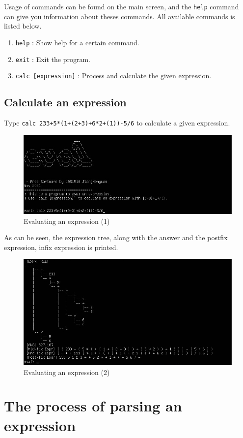 \documentclass[cn,black,12pt,normal]{elegantnote}
\begin{document}
Usage of commands can be found on the main screen, and the \lstinline{help} command can give you information about theses commands.  All available commands is listed below.

\begin{enumerate}
    \item \lstinline{help} : Show help for a certain command.
    \item \lstinline{exit} : Exit the program.
    \item \lstinline{calc [expression]} : Process and calculate the given expression.
\end{enumerate}

\subsection{Calculate an expression}

Type \lstinline{calc 233+5*(1+(2+3)+6*2+(1))-5/6} to calculate a given expression.

\begin{figure}[H]
    \centering
    \includegraphics[width=0.7\linewidth]{image/e02.jpg}
    \caption{Evaluating an expression (1)}
\end{figure}
As can be seen, the expression tree, along with the answer and the postfix expression, infix expression is printed.
\begin{figure}[H]
    \centering
    \includegraphics[width=0.7\linewidth]{image/e03.jpg}
    \caption{Evaluating an expression (2)}
\end{figure}


\section{The process of parsing an expression}
\end{document}
